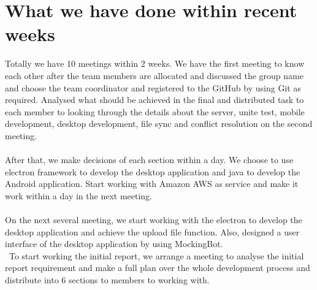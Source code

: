 \section{What we have done within recent weeks}
Totally we have 10 meetings within 2 weeks. We have the first meeting to know each other after the team members are allocated and discussed the group name and choose the team coordinator and registered to the GitHub by using Git as required. Analysed what should be achieved in the final and distributed task to each member to looking through the details about the server, unite test, mobile development, desktop development, file sync and conflict resolution on the second meeting. \\\\
After that, we make decisions of each section within a day. We choose to use electron framework to develop the desktop application and java to develop the Android application. Start working with Amazon AWS as service and make it work within a day in the next meeting. \\\\
On the next several meeting, we start working with the electron to develop the desktop application and achieve the upload file function. Also, designed a user interface of the desktop application by using MockingBot. \\\
To start working the initial report, we arrange a meeting to analyse the initial report requirement and make a full plan over the whole development process and distribute into 6 sections to members to working with.
